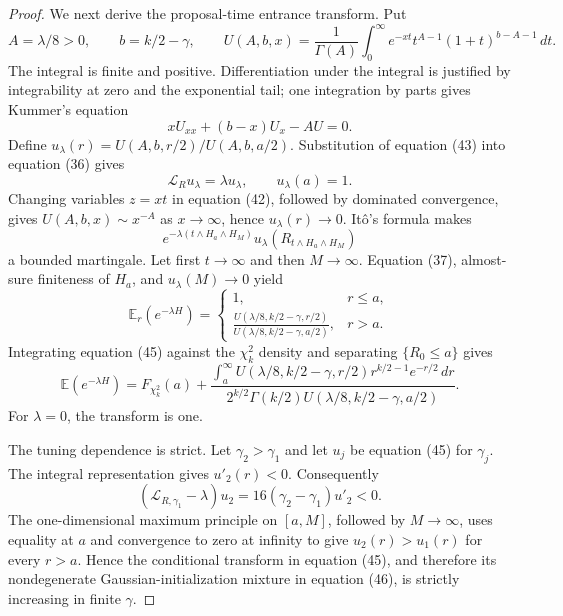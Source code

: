 \documentclass{article}
\begin{document}
\begin{proof}
We next derive the proposal-time entrance transform. Put
\[
 A=\lambda/8>0,\qquad b=k/2-\gamma,\qquad
 U(A,b,x)=\frac1{\Gamma(A)}
 \int_0^\infty e^{-xt}t^{A-1}(1+t)^{b-A-1}\,dt. \tag{42}
\]
The integral is finite and positive. Differentiation under the integral is justified by integrability at zero and the exponential tail; one integration by parts gives Kummer's equation
\[
 xU_{xx}+(b-x)U_x-AU=0. \tag{43}
\]
Define \(u_\lambda(r)=U(A,b,r/2)/U(A,b,a/2)\). Substitution of equation (43) into equation (36) gives
\[
 \mathcal L_Ru_\lambda=\lambda u_\lambda,\qquad u_\lambda(a)=1. \tag{44}
\]
Changing variables \(z=xt\) in equation (42), followed by dominated convergence, gives
\(U(A,b,x)\sim x^{-A}\) as \(x\to\infty\), hence \(u_\lambda(r)\to0\). It\^o's formula makes
\[
 e^{-\lambda(t\wedge H_a\wedge H_M)}
 u_\lambda(R_{t\wedge H_a\wedge H_M})
\]
a bounded martingale. Let first \(t\to\infty\) and then \(M\to\infty\). Equation (37), almost-sure finiteness of \(H_a\), and \(u_\lambda(M)\to0\) yield
\[
 \mathbb E_r(e^{-\lambda H})=
 \begin{cases}
 1,&r\le a,\\[1mm]
 \displaystyle
 \frac{U(\lambda/8,k/2-\gamma,r/2)}
 {U(\lambda/8,k/2-\gamma,a/2)},&r>a.
 \end{cases} \tag{45}
\]
Integrating equation (45) against the \(\chi_k^2\) density and separating \(\{R_0\le a\}\) gives
\[
 \mathbb E(e^{-\lambda H})
 =F_{\chi_k^2}(a)+
 \frac{\displaystyle\int_a^\infty
 U(\lambda/8,k/2-\gamma,r/2)r^{k/2-1}e^{-r/2}\,dr}
 {\displaystyle2^{k/2}\Gamma(k/2)
 U(\lambda/8,k/2-\gamma,a/2)}. \tag{46}
\]
For \(\lambda=0\), the transform is one.

The tuning dependence is strict. Let \(\gamma_2>\gamma_1\) and let \(u_j\) be equation (45) for \(\gamma_j\). The integral representation gives \(u'_2(r)<0\). Consequently
\[
 (\mathcal L_{R,\gamma_1}-\lambda)u_2
 =16(\gamma_2-\gamma_1)u'_2<0. \tag{47}
\]
The one-dimensional maximum principle on \([a,M]\), followed by \(M\to\infty\), uses equality at \(a\) and convergence to zero at infinity to give
\(u_2(r)>u_1(r)\) for every \(r>a\). Hence the conditional transform in equation (45), and therefore its nondegenerate Gaussian-initialization mixture in equation (46), is strictly increasing in finite \(\gamma\).


\end{proof}
\end{document}
